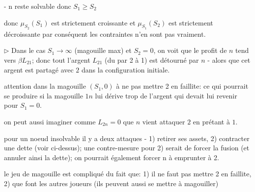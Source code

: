 \documentclass[11pt,oneside,twocolumn]{article}
\begin{document}
- n reste solvable donc $S_{1} \geq S_{2}$


donc $\mu_{S_{2}}(S_{1})$ est strictement croissante et $\mu_{S_{1}}(S_{2})$ est strictement décroissante par conséquent les contraintes n'en sont pas vraiment.


$\triangleright$ 
Dans le cas $S_1\to\infty$ (magouille max) et $S_2=0$, on voit que
le profit de $n$ tend vers $\beta L_{21}$; donc tout l'argent $L_{21}$ (du par 2 à 1) est détourné par $n$ - alors que cet argent est partagé avec $2$ dans la configuration initiale.

attention dans la magouille $(S_1,0)$ à ne pas mettre 2 en faillite:
ce qui pourrait se produire si la magouille $1n$ 
lui dérive trop de l'argent qui devait lui revenir pour $S_1=0$.

on peut aussi imaginer comme $L_{2n}=0$
que $n$ vient attaquer $2$ en prétant à $1$.

pour un noeud insolvable il y a deux attaques - 1) retirer ses assets, 2) contracter une dette (voir ci-dessus); une contre-mesure pour 2) serait de forcer la fusion (et annuler ainsi la dette); on pourrait également forcer n à emprunter à 2.

le jeu de magouille est compliqué du fait que: 1) il ne faut pas mettre 2 en faillite, 2) que font les autres joueurs (ils peuvent aussi se mettre à magouiller)
\end{document}
